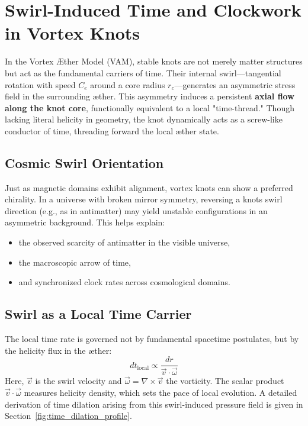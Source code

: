 \section{Swirl-Induced Time and Clockwork in Vortex Knots}

In the Vortex Æther Model (VAM), stable knots are not merely matter structures but act as the fundamental carriers of time. Their internal swirl—tangential rotation with speed \( C_e \) around a core radius \( r_c \)—generates an asymmetric stress field in the surrounding æther. This asymmetry induces a persistent \textbf{axial flow along the knot core}, functionally equivalent to a local "time-thread." Though lacking literal helicity in geometry, the knot dynamically acts as a screw-like conductor of time, threading forward the local æther state.

\subsection*{Cosmic Swirl Orientation}

Just as magnetic domains exhibit alignment, vortex knots can show a preferred chirality. In a universe with broken mirror symmetry, reversing a knot\rqs s swirl direction (e.g., as in antimatter) may yield unstable configurations in an asymmetric background. This helps explain:
\begin{itemize}
    \item the observed scarcity of antimatter in the visible universe,
    \item the macroscopic arrow of time,
    \item and synchronized clock rates across cosmological domains.
\end{itemize}

\subsection*{Swirl as a Local Time Carrier}

The local time rate is governed not by fundamental spacetime postulates, but by the helicity flux in the æther:
\[
    dt_{\text{local}} \propto \frac{dr}{\vec{v} \cdot \vec{\omega}}
\]
Here, \( \vec{v} \) is the swirl velocity and \( \vec{\omega} = \nabla \times \vec{v} \) the vorticity. The scalar product \( \vec{v} \cdot \vec{\omega} \) measures helicity density, which sets the pace of local evolution. A detailed derivation of time dilation arising from this swirl-induced pressure field is given in Section~\ref{fig:time_dilation_profile}.

